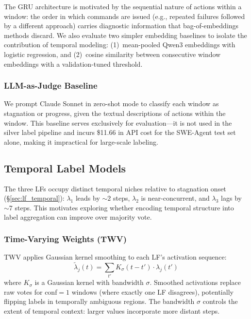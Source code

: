 The GRU architecture is motivated by the sequential nature of actions within a window: the order in which commands are issued (e.g., repeated failures followed by a different approach) carries diagnostic information that bag-of-embeddings methods discard.
We also evaluate two simpler embedding baselines to isolate the contribution of temporal modeling: (1)~mean-pooled Qwen3 embeddings with logistic regression, and (2)~cosine similarity between consecutive window embeddings with a validation-tuned threshold.

\subsubsection{LLM-as-Judge Baseline}
\label{sec:llm_judge}

We prompt Claude Sonnet in zero-shot mode to classify each window as stagnation or progress, given the textual descriptions of actions within the window.
This baseline serves exclusively for evaluation---it is not used in the silver label pipeline and incurs \$11.66 in API cost for the SWE-Agent test set alone, making it impractical for large-scale labeling.

\subsection{Temporal Label Models}
\label{sec:temporal_models}

The three LFs occupy distinct temporal niches relative to stagnation onset (\S\ref{sec:lf_temporal}): $\lambda_1$ leads by ${\sim}2$ steps, $\lambda_2$ is near-concurrent, and $\lambda_3$ lags by ${\sim}7$ steps.
This motivates exploring whether encoding temporal structure into label aggregation can improve over majority vote.

\subsubsection{Time-Varying Weights (TWV)}
\label{sec:twv}

TWV applies Gaussian kernel smoothing to each LF's activation sequence:
\begin{equation}
\tilde{\lambda}_j(t) = \sum_{t'} K_\sigma(t - t') \cdot \lambda_j(t')
\label{eq:twv}
\end{equation}
where $K_\sigma$ is a Gaussian kernel with bandwidth $\sigma$.
Smoothed activations replace raw votes for conf${=}1$ windows (where exactly one LF disagrees), potentially flipping labels in temporally ambiguous regions.
The bandwidth $\sigma$ controls the extent of temporal context: larger values incorporate more distant steps.

